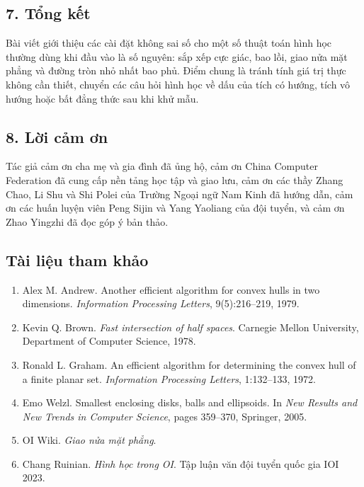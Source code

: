 \documentclass[11pt]{article}
\begin{document}

\subsection*{7. Tổng kết}

Bài viết giới thiệu các cài đặt không sai số cho một số thuật toán hình học
thường dùng khi đầu vào là số nguyên: sắp xếp cực giác, bao lồi, giao nửa mặt
phẳng và đường tròn nhỏ nhất bao phủ. Điểm chung là tránh tính giá trị thực
không cần thiết, chuyển các câu hỏi hình học về dấu của tích có hướng, tích vô
hướng hoặc bất đẳng thức sau khi khử mẫu.

\subsection*{8. Lời cảm ơn}

Tác giả cảm ơn cha mẹ và gia đình đã ủng hộ, cảm ơn China Computer Federation
đã cung cấp nền tảng học tập và giao lưu, cảm ơn các thầy Zhang Chao, Li Shu
và Shi Polei của Trường Ngoại ngữ Nam Kinh đã hướng dẫn, cảm ơn các huấn luyện
viên Peng Sijin và Yang Yaoliang của đội tuyển, và cảm ơn Zhao Yingzhi đã đọc
góp ý bản thảo.

\subsection*{Tài liệu tham khảo}

\begin{enumerate}
  \item Alex M. Andrew. Another efficient algorithm for convex hulls in two
  dimensions. \emph{Information Processing Letters}, 9(5):216--219, 1979.
  \item Kevin Q. Brown. \emph{Fast intersection of half spaces}. Carnegie
  Mellon University, Department of Computer Science, 1978.
  \item Ronald L. Graham. An efficient algorithm for determining the convex hull
  of a finite planar set. \emph{Information Processing Letters}, 1:132--133,
  1972.
  \item Emo Welzl. Smallest enclosing disks, balls and ellipsoids. In
  \emph{New Results and New Trends in Computer Science}, pages 359--370,
  Springer, 2005.
  \item OI Wiki. \emph{Giao nửa mặt phẳng}.
  \item Chang Ruinian. \emph{Hình học trong OI}. Tập luận văn đội tuyển quốc
  gia IOI 2023.
\end{enumerate}
\end{document}
